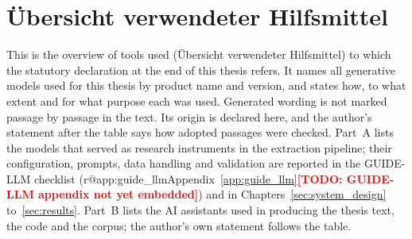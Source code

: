 \documentclass[12pt, a4paper]{article}
\makeatletter
\newcommand{\authorfix}[1]{\textcolor{red}{\textbf{#1}}}
\newcommand{\guideref}{\ifcsname r@app:guide_llm\endcsname Appendix~\ref{app:guide_llm}\else\authorfix{[TODO: GUIDE-LLM appendix not yet embedded]}\fi}
\theoremstyle{definition}
\makeatother
\begin{document}
\section*{Übersicht verwendeter Hilfsmittel}
\RaggedRight
This is the overview of tools used (\foreignlanguage{ngerman}{Übersicht verwendeter Hilfsmittel}) to which the statutory declaration at the end of this thesis refers. It names all generative models used for this thesis by product name and version, and states how, to what extent and for what purpose each was used. Generated wording is not marked passage by passage in the text. Its origin is declared here, and the author's statement after the table says how adopted passages were checked. Part~A lists the models that served as research instruments in the extraction pipeline; their configuration, prompts, data handling and validation are reported in the GUIDE-LLM checklist (\guideref) and in Chapters~\ref{sec:system_design} to~\ref{sec:results}. Part~B lists the AI assistants used in producing the thesis text, the code and the corpus; the author's own statement follows the table.
\end{document}
